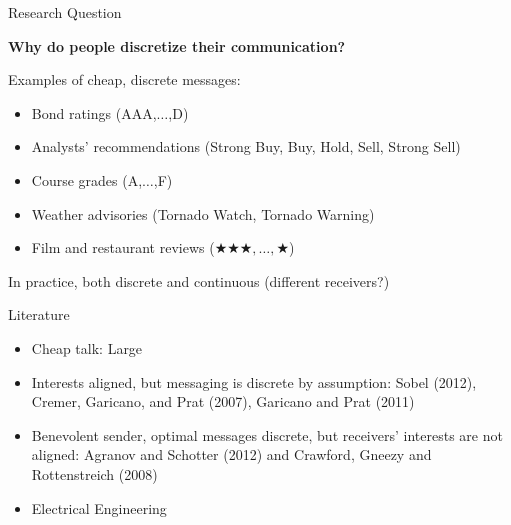 \documentclass[hyperref={colorlinks=true,linkcolor=blue,citecolor=blue}]{beamer}
\begin{document}
\begin{frame}{Research Question}
\begin{center}
\textbf{Why do people discretize their communication?}
\end{center}
\vspace{.25in}
Examples of cheap, discrete messages:
\begin{itemize}
\item Bond ratings (AAA,$\ldots$,D)
\item Analysts' recommendations (Strong Buy, Buy, Hold, Sell, Strong Sell)
\item Course grades (A,$\ldots$,F)
\item Weather advisories (Tornado Watch, Tornado Warning)
\item Film and restaurant reviews ($\bigstar\bigstar\bigstar,\ldots,\bigstar$)  
\end{itemize}
\pause In practice, both discrete and continuous (different receivers?)
\end{frame}


\begin{frame}{Literature}
\begin{itemize}
\item Cheap talk: Large
\item Interests aligned, but messaging is discrete by assumption: {\small Sobel (2012), Cremer, Garicano, and Prat (2007), Garicano and Prat (2011)}
\item Benevolent sender, optimal messages discrete, but receivers' interests are not aligned: {\small Agranov and Schotter (2012) and Crawford, Gneezy and Rottenstreich (2008)}
\item Electrical Engineering
\end{itemize}
\end{frame}
\end{document}
